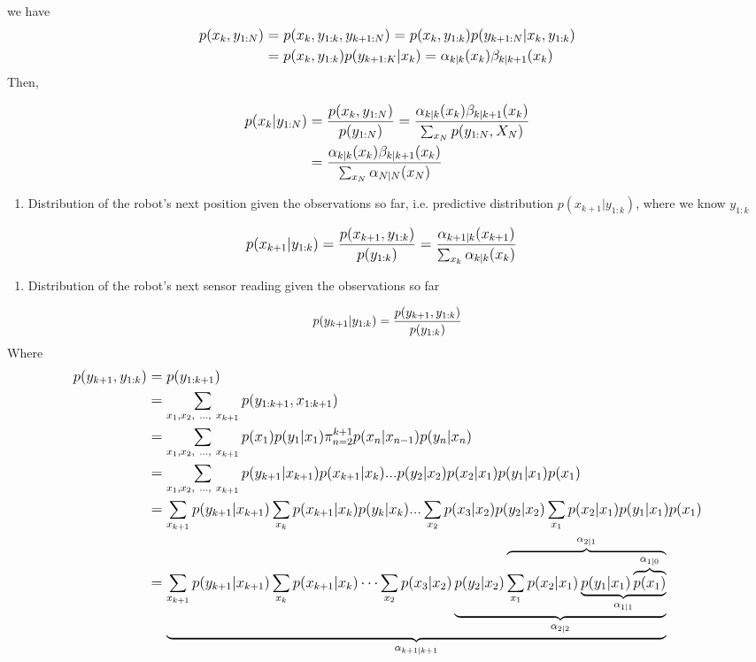 \documentclass[11pt]{article}
\providecommand{\tightlist}{%
      \setlength{\itemsep}{0pt}\setlength{\parskip}{0pt}}
\begin{document}
we have \[\large
\begin{align*}
p(x_k , y_{1:N}) &= p(x_k, y_{1:k}, y_{k+1:N}) = p(x_k, y_{1:k}) p(y_{k+1:N}|x_k, y_{1:k}) \\
   &= p(x_k, y_{1:k}) p(y_{k+1:K}|x_k) =  \alpha_{k|k}(x_k)  \beta_{k|k+1}(x_k) 
\end{align*}
\] Then,

\[\large
\begin{align*}
p(x_k | y_{1:N}) &= \frac{p(x_k , y_{1:N})}{p(y_{1:N})} =  \frac{\alpha_{k|k}(x_k)\beta_{k|k+1}(x_k)}{\sum_{x_N}p(y_{1:N}, X_N)} \\
& = \frac{\alpha_{k|k}(x_k)\beta_{k|k+1}(x_k)}{\sum_{x_N}\alpha_{N|N}(x_N)} 
\end{align*}
\]

    \begin{enumerate}
\def\labelenumi{(\alph{enumi})}
\setcounter{enumi}{2}
\tightlist
\item
  Distribution of the robot's next position given the observations so
  far, i.e. predictive distribution \(p(x_{k+1}|y_{1:k})\), where we
  know \(y_{1:k}\)
\end{enumerate}

\[\large
\begin{align*}
p(x_{k+1}|y_{1:k}) &= \frac{p(x_{k+1},y_{1:k})}{p(y_{1:k})} = \frac{\alpha_{k+1|k}(x_{k+1})}{\sum_{x_k}\alpha_{k|k}(x_k)} 
\end{align*}
\]

    \begin{enumerate}
\def\labelenumi{(\alph{enumi})}
\setcounter{enumi}{3}
\tightlist
\item
  Distribution of the robot's next sensor reading given the observations
  so far
\end{enumerate}

\[
\large p(y_{k+1}|y_{1:k}) = \frac{p(y_{k+1},y_{1:k})}{p(y_{1:k})}
\] Where \[\large
\begin{align*}
p(y_{k+1},y_{1:k}) &= p(y_{1:k+1}) \\
    &= \sum_{x_1, x_2, \ ...,\ x_{k+1}} p(y_{1:k+1}, x_{1:k+1}) \\
    &= \sum_{x_1, x_2, \ ...,\ x_{k+1}}p(x_1)p(y_1|x_1)\pi_{n=2}^{k+1}p(x_n|x_{n-1})p(y_n|x_n) \\
    &= \sum_{x_1, x_2, \ ...,\ x_{k+1}}p(y_{k+1}|x_{k+1})p(x_{k+1}|x_{k})  ...p(y_{2}|x_{2})p(x_2|x_{1})p(y_{1}|x_{1})p(x_{1}) \\
    &= \sum_{x_{k+1}}p(y_{k+1}|x_{k+1})\sum_{x_k}p(x_{k+1}|x_{k})p(y_k|x_k)...  \sum_{x_2}p(x_{3}|x_{2})p(y_2|x_2)\sum_{x_1}p(x_{2}|x_{1})p(y_1|x_1)p(x_1)  \\
   &=\underbrace{\sum_{x_{k+1}} p(y_{k+1} | x_{k+1} ) \sum_{x_{k}} p(x_{k+1}|x_{k})  \dots \sum_{x_{2}} p(x_3|x_{2})
\underbrace{ p(y_{2}|x_{2}) \overbrace{ \sum_{x_{1}} p(x_2|x_{1})
\underbrace{ p(y_{1}|x_{1}) \overbrace{ p(x_1)}^{\alpha_{1|0}}}_{\alpha_{1|1}}
}^{\alpha_{2|1}} }_{\alpha_{2|2}}}_{\alpha_{k+1|k+1}} 
\end{align*}
\]
\end{document}
